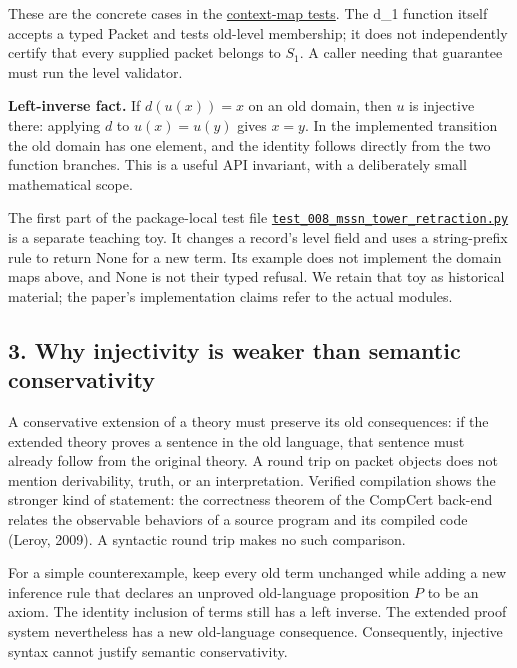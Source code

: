 \documentclass[
  11pt,
]{article}
\begin{document}
These are the concrete cases in the
\href{https://github.com/dbccpage/the_symbol_game/blob/52cb5457f6c485ba548cfd292f6012a941ed22cf/research/mssn_sn_tower/code/python/tests/test_mssn_updown_and_cells.py}{context-map
tests}. The d\_1 function itself accepts a typed Packet and tests
old-level membership; it does not independently certify that every
supplied packet belongs to \(S_1\). A caller needing that guarantee must
run the level validator.

\textbf{Left-inverse fact.} If \(d(u(x))=x\) on an old domain, then
\(u\) is injective there: applying \(d\) to \(u(x)=u(y)\) gives \(x=y\).
In the implemented transition the old domain has one element, and the
identity follows directly from the two function branches. This is a
useful API invariant, with a deliberately small mathematical scope.

The first part of the package-local test file
\href{https://github.com/dbccpage/the_symbol_game/blob/main/education/documentation/030_pfp_proposal_fidelity_protocol_pfp/papers/symbol_game/008_pfp_mssn_tower_challenges_and_retraction_benchmarks/code/tests/test_008_mssn_tower_retraction.py}{\nolinkurl{test_008_mssn_tower_retraction.py}}
is a separate teaching toy. It changes a record's level field and uses a
string-prefix rule to return None for a new term. Its example does not
implement the domain maps above, and None is not their typed refusal. We
retain that toy as historical material; the paper's implementation
claims refer to the actual modules.

\hypertarget{why-injectivity-is-weaker-than-semantic-conservativity}{%
\subsection{3. Why injectivity is weaker than semantic
conservativity}\label{why-injectivity-is-weaker-than-semantic-conservativity}}

A conservative extension of a theory must preserve its old consequences:
if the extended theory proves a sentence in the old language, that
sentence must already follow from the original theory. A round trip on
packet objects does not mention derivability, truth, or an
interpretation. Verified compilation shows the stronger kind of
statement: the correctness theorem of the CompCert back-end relates the
observable behaviors of a source program and its compiled code (Leroy,
2009). A syntactic round trip makes no such comparison.

For a simple counterexample, keep every old term unchanged while adding
a new inference rule that declares an unproved old-language proposition
\(P\) to be an axiom. The identity inclusion of terms still has a left
inverse. The extended proof system nevertheless has a new old-language
consequence. Consequently, injective syntax cannot justify semantic
conservativity.
\end{document}
